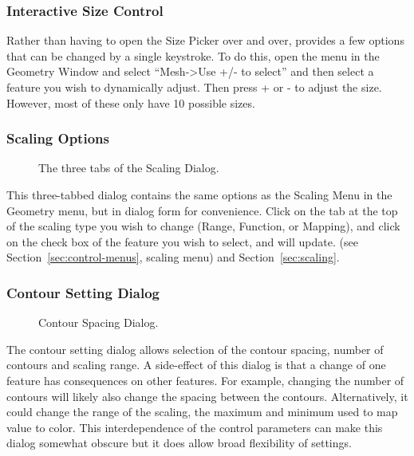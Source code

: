 \subsubsection{Interactive Size Control}
\label{sec:interactive-size}

Rather than having to open the Size Picker over and over, \map{} provides a
few options that can be changed by a single keystroke.  To do this, open
the menu in the Geometry Window and select ``Mesh->Use +/- to select'' and
then select a feature you wish to dynamically adjust.  Then press + or - to
adjust the size.  However, most of these only have 10 possible sizes.



\subsubsection{Scaling Options}
\label{sec:scalinggui}

\begin{figure}[htb]
  \begin{makeimage}
  \end{makeimage}
  \scaledialog
  \caption{\label{fig:scale1} The three tabs of the Scaling Dialog.}
\end{figure}

This three-tabbed dialog contains the same options as the Scaling Menu in
the Geometry menu, but in dialog form for convenience.  Click on the tab at
the top of the scaling type you wish to change (Range, Function, or
Mapping), and click on the check box of the feature you wish to select, and
\map{} will update.  (see Section~\ref{sec:control-menus}, scaling menu)
and Section~\ref{sec:scaling}.

\subsubsection{Contour Setting Dialog}
\label{sec:contourwindow}

\begin{figure}[htb]
  \begin{makeimage}
  \end{makeimage}
  \contourdialog
  \caption{\label{fig:contourdialog} Contour Spacing Dialog.}
\end{figure}

The contour setting dialog allows selection of the contour spacing, number
of contours and scaling range.  A side-effect of this dialog is that a
change of one feature has consequences on other features.  For example,
changing the number of contours will likely also change the spacing between
the contours.  Alternatively, it could change the range of the scaling,
\ie{} the maximum and minimum used to map value to color.  This
interdependence of the control parameters can make this dialog somewhat
obscure but it does allow broad flexibility of settings.

